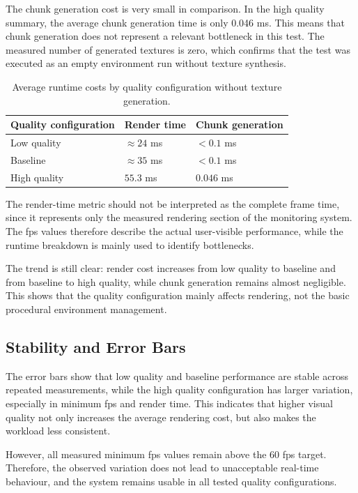 The chunk generation cost is very small in comparison. In the high quality summary, the average chunk generation time is only 0.046 ms. This means that chunk generation does not represent a relevant bottleneck in this test. The measured number of generated textures is zero, which confirms that the test was executed as an empty environment run without texture synthesis.

\begin{table}[H]
    \centering
    \caption{Average runtime costs by quality configuration without texture generation.}
    \label{tab:quality_runtime_costs}
    \begin{tabularx}{\textwidth}{|X|X|X|}
    \hline
    \textbf{Quality configuration} & \textbf{Render time} & \textbf{Chunk generation} \\
    \hline
    \hline
    Low quality & $\approx 24$ ms & $< 0.1$ ms \\
    \hline
    Baseline & $\approx 35$ ms & $< 0.1$ ms \\
    \hline
    High quality & $55.3$ ms & $0.046$ ms \\
    \hline
    \end{tabularx}
\end{table}

The render-time metric should not be interpreted as the complete frame time, since it represents only the measured rendering section of the monitoring system. The \gls{fps} values therefore describe the actual user-visible performance, while the runtime breakdown is mainly used to identify bottlenecks.

The trend is still clear: render cost increases from low quality to baseline and from baseline to high quality, while chunk generation remains almost negligible. This shows that the quality configuration mainly affects rendering, not the basic procedural environment management.

\subsection{Stability and Error Bars}

The error bars show that low quality and baseline performance are stable across repeated measurements, while the high quality configuration has larger variation, especially in minimum \gls{fps} and render time. This indicates that higher visual quality not only increases the average rendering cost, but also makes the workload less consistent.

However, all measured minimum \gls{fps} values remain above the 60 \gls{fps} target. Therefore, the observed variation does not lead to unacceptable real-time behaviour, and the system remains usable in all tested quality configurations.

